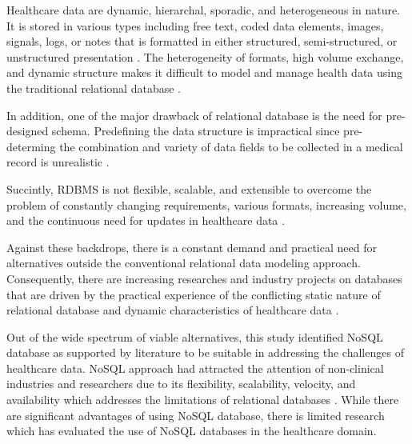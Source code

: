 \documentclass[5p]{elsarticle}
\begin{document}
Healthcare data are dynamic, hierarchal, sporadic, and heterogeneous in nature. 
It is stored in various types including free text, coded data elements, images, signals, logs, or notes that is formatted in either structured, semi-structured, 
or unstructured presentation \cite{M.Ercan190510,K.Lee201299,C.S.Kruse201638,S.White201413,S.Wasan1192016}.
The heterogeneity of formats, high volume exchange, and dynamic structure makes it difficult to model and manage health 
data using the traditional relational database \cite{K.Lee201299,H.Al-Fatlawi2015122,O.Schmitt20121,Y.Jin2011288}.

In addition, one of the major drawback of relational database is the need for pre-designed schema. 
Predefining the data structure is impractical since pre-determing the combination and variety of data fields to be collected in a medical record is unrealistic \cite{K.Lee201299}. 

Succintly, RDBMS is not flexible, scalable, and extensible to overcome the problem of constantly changing requirements, various formats, increasing volume, and the continuous need for updates in healthcare data \cite{Z.Goli-Malekabadi201675,K.Lee201299,H.Al-Fatlawi2015122,O.Schmitt20121,Y.Jin2011288}.

Against these backdrops, there is a constant demand and practical need for alternatives outside the conventional relational data modeling approach. 
Consequently, there are increasing researches and industry projects on databases that are driven by the practical experience of the conflicting static 
nature of relational database and dynamic characteristics of healthcare data \cite{M.Ercan190510}.

Out of the wide spectrum of viable alternatives, this study identified NoSQL database as supported by literature to be suitable in addressing the challenges of 
healthcare data. NoSQL approach had attracted the attention of non-clinical industries  and researchers due to its flexibility, scalability, velocity, and 
availability which addresses the limitations of relational databases \cite{M.Ercan190510,C.S.Kruse201638,Z.Parker20131,G.D.Ferreira2013125}.
While there are significant advantages of using NoSQL database, there is limited research which has evaluated the use of NoSQL databases in the healthcare domain.
\end{document}
